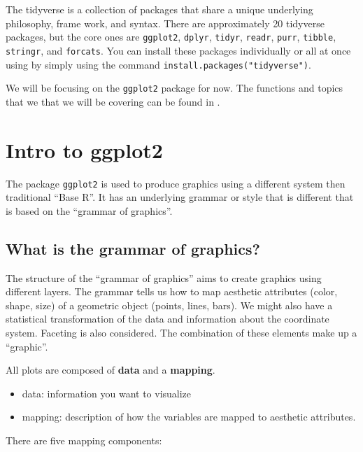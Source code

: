 \documentclass[
]{book}
\begin{document}
The tidyverse is a collection of packages that share a unique underlying philosophy, frame work, and syntax. There are approximately 20 tidyverse packages, but the core ones are \texttt{ggplot2}, \texttt{dplyr}, \texttt{tidyr}, \texttt{readr}, \texttt{purr}, \texttt{tibble}, \texttt{stringr}, and \texttt{forcats}. You can install these packages individually or all at once using by simply using the command \texttt{install.packages("tidyverse")}.

We will be focusing on the \texttt{ggplot2} package for now. The functions and topics that we that we will be covering can be found in \citet{wickham2009elegant}.

\hypertarget{intro-to-ggplot2}{%
\section{Intro to ggplot2}\label{intro-to-ggplot2}}

The package \texttt{ggplot2} is used to produce graphics using a different system then traditional ``Base R''. It has an underlying grammar or style that is different that is based on the ``grammar of graphics''.

\hypertarget{what-is-the-grammar-of-graphics}{%
\subsection*{What is the grammar of graphics?}\label{what-is-the-grammar-of-graphics}}

The structure of the ``grammar of graphics'' aims to create graphics using different layers. The grammar tells us how to map aesthetic attributes (color, shape, size) of a geometric object (points, lines, bars). We might also have a statistical transformation of the data and information about the coordinate system. Faceting is also considered. The combination of these elements make up a ``graphic''.

All plots are composed of \textbf{data} and a \textbf{mapping}.

\begin{itemize}
\item
  data: information you want to visualize
\item
  mapping: description of how the variables are mapped to aesthetic attributes.
\end{itemize}

There are five mapping components:
\end{document}
